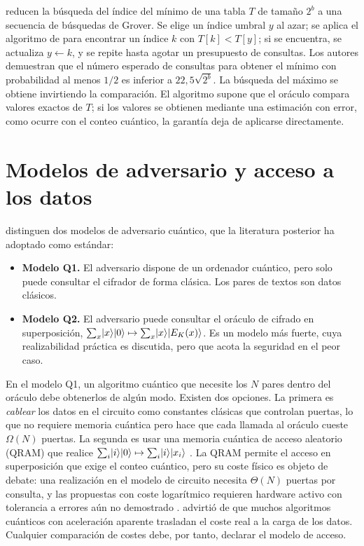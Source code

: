 \citet{durr1996} reducen la búsqueda del índice del mínimo de una tabla \(T\) de tamaño \(2^b\) a una secuencia de búsquedas de Grover. Se elige un índice umbral \(y\) al azar; se aplica el algoritmo de \citet{bbht1998} para encontrar un índice \(k\) con \(T[k]<T[y]\); si se encuentra, se actualiza \(y\gets k\), y se repite hasta agotar un presupuesto de consultas. Los autores demuestran que el número esperado de consultas para obtener el mínimo con probabilidad al menos \(1/2\) es inferior a \(22{,}5\sqrt{2^b}\). La búsqueda del máximo se obtiene invirtiendo la comparación. El algoritmo supone que el oráculo compara valores exactos de \(T\); si los valores se obtienen mediante una estimación con error, como ocurre con el conteo cuántico, la garantía deja de aplicarse directamente.

\section{Modelos de adversario y acceso a los datos}
\label{sec:modelos}

\citet{kaplan2016diff} distinguen dos modelos de adversario cuántico, que la literatura posterior ha adoptado como estándar:
\begin{itemize}
 \item \textbf{Modelo Q1.} El adversario dispone de un ordenador cuántico, pero solo puede consultar el cifrador de forma clásica. Los pares de textos son datos clásicos.
 \item \textbf{Modelo Q2.} El adversario puede consultar el oráculo de cifrado en superposición, \(\sum_x\lvert x\rangle\lvert 0\rangle\mapsto\sum_x\lvert x\rangle\lvert E_K(x)\rangle\). Es un modelo más fuerte, cuya realizabilidad práctica es discutida, pero que acota la seguridad en el peor caso.
\end{itemize}
En el modelo Q1, un algoritmo cuántico que necesite los \(N\) pares dentro del oráculo debe obtenerlos de algún modo. Existen dos opciones. La primera es \emph{cablear} los datos en el circuito como constantes clásicas que controlan puertas, lo que no requiere memoria cuántica pero hace que cada llamada al oráculo cueste \(\Omega(N)\) puertas. La segunda es usar una memoria cuántica de acceso aleatorio (QRAM) que realice \(\sum_i\lvert i\rangle\lvert 0\rangle\mapsto\sum_i\lvert i\rangle\lvert x_i\rangle\) \citep{glm2008qram}. La QRAM permite el acceso en superposición que exige el conteo cuántico, pero su coste físico es objeto de debate: una realización en el modelo de circuito necesita \(\Theta(N)\) puertas por consulta, y las propuestas con coste logarítmico requieren hardware activo con tolerancia a errores aún no demostrado \citep{jaques2023qram}. \citet{aaronson2015} advirtió de que muchos algoritmos cuánticos con aceleración aparente trasladan el coste real a la carga de los datos. Cualquier comparación de costes debe, por tanto, declarar el modelo de acceso.

